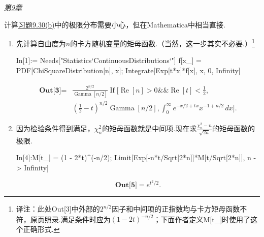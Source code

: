 \medskip\noindent\textit{\hyperref[sec:9]{第9章}}
\begin{example}[卡方矩母函数的极限]\label{ex:12.6.8}
计算\hyperref[exercise:9.30]{习题9.30(b)}中的极限分布需要小心，但在Mathematica中相当直接.
\begin{enumerate}[label=(\arabic*)]
\item 先计算自由度为$n$的卡方随机变量的矩母函数.（当然，这一步其实不必要.）\footnote{译注：此处Out[3]中外部的$2^{n/2}$因子和中间项的正指数均与卡方矩母函数不符，原页照录.满足条件时应为$(1-2t)^{-n/2}$；下面作者定义M[t\_]时使用了这个正确形式.}
\begin{sourcecode}
In[1]:= Needs["Statistics`ContinuousDistributions`"]
f[x_] = PDF[ChiSquareDistribution[n], x];
Integrate[Exp[t*x]*f[x], {x, 0, Infinity}]
\end{sourcecode}
\begin{equation*}\begin{aligned}
\textbf{Out[3]}={}&\frac{2^{n/2}}{\operatorname{Gamma}[n/2]}\operatorname{If}\Biggl[\operatorname{Re}[n]>0\mathbin{\&\&}\operatorname{Re}[t]<\frac12,\\
&\left(\frac12-t\right)^{n/2}\operatorname{Gamma}[n/2],\int_0^\infty e^{-x/2+tx}x^{-1+n/2}\,dx\Biggr].
\end{aligned}\end{equation*}

\item 因为检验条件得到满足，$\chi_n^2$的矩母函数就是中间项.现在求$\frac{\chi_n^2-n}{\sqrt{2n}}$的矩母函数的极限.
\begin{sourcecode}
In[4]:M[t_] = (1 - 2*t)^(-n/2);
Limit[Exp[-n*t/Sqrt[2*n]]*M[t/Sqrt[2*n]], n -> Infinity]
\end{sourcecode}
$$\textbf{Out[5]}=e^{t^2/2}.$$
\end{enumerate}
\end{example}
